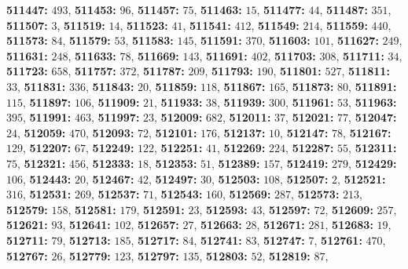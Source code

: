 \textsf{\bfseries 511447:} $493$, \textsf{\bfseries 511453:} $96$, \textsf{\bfseries 511457:} $75$, \textsf{\bfseries 511463:} $15$, \textsf{\bfseries 511477:} $44$, \textsf{\bfseries 511487:} $351$, \textsf{\bfseries 511507:} $3$, \textsf{\bfseries 511519:} $14$, \textsf{\bfseries 511523:} $41$, \textsf{\bfseries 511541:} $412$, \textsf{\bfseries 511549:} $214$, \textsf{\bfseries 511559:} $440$, \textsf{\bfseries 511573:} $84$, \textsf{\bfseries 511579:} $53$, \textsf{\bfseries 511583:} $145$, \textsf{\bfseries 511591:} $370$, \textsf{\bfseries 511603:} $101$, \textsf{\bfseries 511627:} $249$, \textsf{\bfseries 511631:} $248$, \textsf{\bfseries 511633:} $78$, \textsf{\bfseries 511669:} $143$, \textsf{\bfseries 511691:} $402$, \textsf{\bfseries 511703:} $308$, \textsf{\bfseries 511711:} $34$, \textsf{\bfseries 511723:} $658$, \textsf{\bfseries 511757:} $372$, \textsf{\bfseries 511787:} $209$, \textsf{\bfseries 511793:} $190$, \textsf{\bfseries 511801:} $527$, \textsf{\bfseries 511811:} $33$, \textsf{\bfseries 511831:} $336$, \textsf{\bfseries 511843:} $20$, \textsf{\bfseries 511859:} $118$, \textsf{\bfseries 511867:} $165$, \textsf{\bfseries 511873:} $80$, \textsf{\bfseries 511891:} $115$, \textsf{\bfseries 511897:} $106$, \textsf{\bfseries 511909:} $21$, \textsf{\bfseries 511933:} $38$, \textsf{\bfseries 511939:} $300$, \textsf{\bfseries 511961:} $53$, \textsf{\bfseries 511963:} $395$, \textsf{\bfseries 511991:} $463$, \textsf{\bfseries 511997:} $23$, \textsf{\bfseries 512009:} $682$, \textsf{\bfseries 512011:} $37$, \textsf{\bfseries 512021:} $77$, \textsf{\bfseries 512047:} $24$, \textsf{\bfseries 512059:} $470$, \textsf{\bfseries 512093:} $72$, \textsf{\bfseries 512101:} $176$, \textsf{\bfseries 512137:} $10$, \textsf{\bfseries 512147:} $78$, \textsf{\bfseries 512167:} $129$, \textsf{\bfseries 512207:} $67$, \textsf{\bfseries 512249:} $122$, \textsf{\bfseries 512251:} $41$, \textsf{\bfseries 512269:} $224$, \textsf{\bfseries 512287:} $55$, \textsf{\bfseries 512311:} $75$, \textsf{\bfseries 512321:} $456$, \textsf{\bfseries 512333:} $18$, \textsf{\bfseries 512353:} $51$, \textsf{\bfseries 512389:} $157$, \textsf{\bfseries 512419:} $279$, \textsf{\bfseries 512429:} $106$, \textsf{\bfseries 512443:} $20$, \textsf{\bfseries 512467:} $42$, \textsf{\bfseries 512497:} $30$, \textsf{\bfseries 512503:} $108$, \textsf{\bfseries 512507:} $2$, \textsf{\bfseries 512521:} $316$, \textsf{\bfseries 512531:} $269$, \textsf{\bfseries 512537:} $71$, \textsf{\bfseries 512543:} $160$, \textsf{\bfseries 512569:} $287$, \textsf{\bfseries 512573:} $213$, \textsf{\bfseries 512579:} $158$, \textsf{\bfseries 512581:} $179$, \textsf{\bfseries 512591:} $23$, \textsf{\bfseries 512593:} $43$, \textsf{\bfseries 512597:} $72$, \textsf{\bfseries 512609:} $257$, \textsf{\bfseries 512621:} $93$, \textsf{\bfseries 512641:} $102$, \textsf{\bfseries 512657:} $27$, \textsf{\bfseries 512663:} $28$, \textsf{\bfseries 512671:} $281$, \textsf{\bfseries 512683:} $19$, \textsf{\bfseries 512711:} $79$, \textsf{\bfseries 512713:} $185$, \textsf{\bfseries 512717:} $84$, \textsf{\bfseries 512741:} $83$, \textsf{\bfseries 512747:} $7$, \textsf{\bfseries 512761:} $470$, \textsf{\bfseries 512767:} $26$, \textsf{\bfseries 512779:} $123$, \textsf{\bfseries 512797:} $135$, \textsf{\bfseries 512803:} $52$, \textsf{\bfseries 512819:} $87$, 
